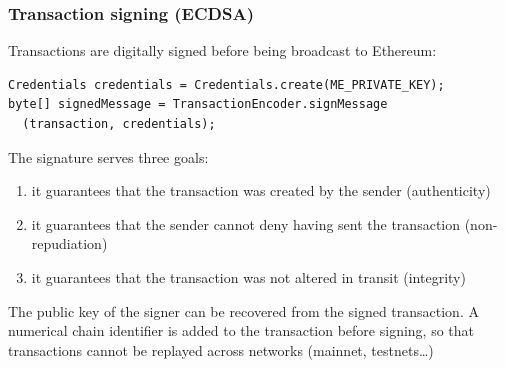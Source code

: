 \documentclass[11pt]{beamer}  %
\begin{document}
\begin{frame}[fragile]\frametitle{Transaction signing (ECDSA)}

  Transactions are digitally signed before being broadcast to Ethereum:

{\small\begin{verbatim}
Credentials credentials = Credentials.create(ME_PRIVATE_KEY);
byte[] signedMessage = TransactionEncoder.signMessage
  (transaction, credentials);
\end{verbatim}}

  The signature serves three goals:
  \begin{enumerate}
  \item it guarantees that the transaction was created by the sender (\alert{authenticity})
  \item it guarantees that the sender cannot deny having sent the transaction (\alert{non-repudiation})
  \item it guarantees that the transaction was not altered in transit (\alert{integrity})
  \end{enumerate}

  \bigskip

  \begin{greenbox}{}
    The public key of the signer can be recovered from the signed transaction.
    A numerical \alert{chain identifier} is added to the transaction before signing,
    so that transactions cannot be replayed across networks
    (mainnet, testnets\ldots)
  \end{greenbox}
\end{frame}
\end{document}
